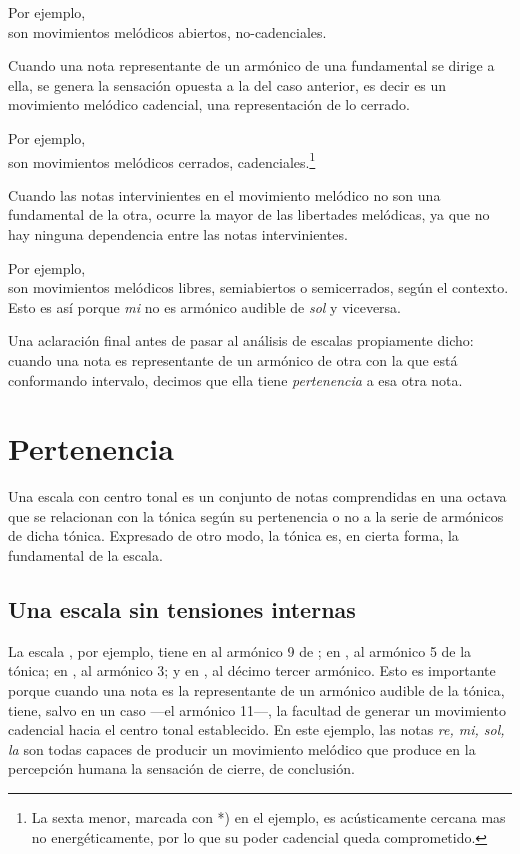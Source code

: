 \documentclass[a4paper,10pt]{article}
\begin{document}
\begin{multicols}{2}
  Por ejemplo, \\   son movimientos melódicos abiertos, no-cadenciales.

  Cuando una nota representante de un armónico de una fundamental se dirige a ella, se genera la sensación opuesta a la del caso anterior, es decir es un movimiento melódico cadencial, una representación de lo cerrado.

  Por ejemplo, \\  son movimientos melódicos cerrados, cadenciales.\footnote{La sexta menor, marcada con *) en el ejemplo, es acústicamente cercana mas no energéticamente, por lo que su poder cadencial queda comprometido.}

  Cuando las notas intervinientes en el movimiento melódico no son una fundamental de la otra, ocurre la mayor de las libertades melódicas, ya que no hay ninguna dependencia entre las notas intervinientes.

  Por ejemplo, \\   son movimientos melódicos libres, semiabiertos o semicerrados, según el contexto. Esto es así porque \emph{mi} no es armónico audible de \emph{sol} y viceversa.

  Una aclaración final antes de pasar al análisis de escalas propiamente dicho: cuando una nota es representante de un armónico de otra con la que está conformando intervalo, decimos que ella tiene \emph{pertenencia} a esa otra nota.

\section{Pertenencia}\label{sec:pertenencia}
  Una escala con centro tonal es un conjunto de notas comprendidas en una octava que se relacionan con la tónica según su pertenencia o no a la serie de armónicos de dicha tónica. Expresado de otro modo, la tónica es, en cierta forma, la fundamental de la escala.

    \subsection{Una escala sin tensiones internas}\label{subsec:escala-sin-tensiones}
    La escala \hbox{,} por ejemplo, tiene en  al armónico 9 de \hbox{;} en \hbox{,} al armónico 5 de la tónica; en \hbox{,} al armónico 3; y en \hbox{,} al décimo tercer armónico. Esto es importante porque cuando una nota es la representante de un armónico audible de la tónica, tiene, salvo en un caso ---el armónico 11---, la facultad de generar un movimiento cadencial hacia el centro tonal establecido. En este ejemplo, las notas \emph{re, mi, sol, la} son todas capaces de producir un movimiento melódico que produce en la percepción humana la sensación de cierre, de conclusión.
\end{multicols}
\end{document}
